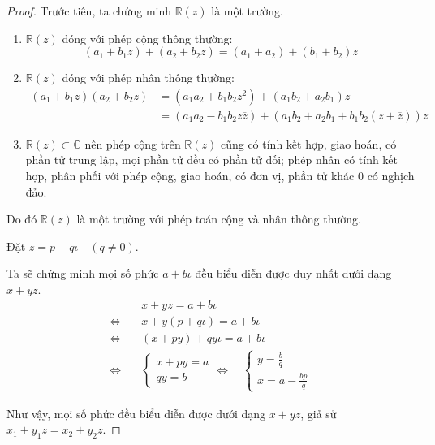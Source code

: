 \documentclass[class=linearalgebra,crop=false]{standalone}
\begin{document}
\begin{proof}Trước tiên, ta chứng minh $\mathbb{R}(z)$ là một trường.
    \begin{enumerate}[label = (\roman*)]
        \item $\mathbb{R}(z)$ đóng với phép cộng thông thường:
        \[ (a_{1} + b_{1}z) + (a_{2} + b_{2}z) = (a_{1} + a_{2}) + (b_{1} + b_{2})z \]
        \item $\mathbb{R}(z)$ đóng với phép nhân thông thường:
        \begin{align*}
            (a_{1} + b_{1}z)(a_{2} + b_{2}z) &= (a_{1}a_{2} + b_{1}b_{2}z^{2}) + (a_{1}b_{2} + a_{2}b_{1})z \\
                                             &= (a_{1}a_{2} - b_{1}b_{2}z\overline{z}) + (a_{1}b_{2} + a_{2}b_{1} + b_{1}b_{2}(z + \overline{z}))z
        \end{align*}
        \item $\mathbb{R}(z) \subset \mathbb{C}$ nên phép cộng trên $\mathbb{R}(z)$ cũng có tính kết hợp, giao hoán, có phần tử trung lập, mọi phần tử đều có phần tử đối; phép nhân có tính kết hợp, phân phối với phép cộng, giao hoán, có đơn vị, phần tử khác 0 có nghịch đảo.
    \end{enumerate}
    \par Do đó $\mathbb{R}(z)$ là một trường với phép toán cộng và nhân thông thường.
    \par Đặt $z = p + q\iota \quad (q\ne 0)$.
    \par Ta sẽ chứng minh mọi số phức $a + b\iota$ đều biểu diễn được duy nhất dưới dạng $x + yz$.
    \begin{align*}
        &x + yz = a + b\iota \\
        \Leftrightarrow\quad& x + y(p + q\iota) = a + b\iota \\
        \Leftrightarrow\quad& (x + py) + qy\iota = a + b\iota \\
        \Leftrightarrow\quad&
        \begin{cases}
            x + py = a \\
            qy = b
        \end{cases}
        \Leftrightarrow\quad
        \begin{cases}
            y = \frac{b}{q} \\
            x = a - \frac{bp}{q}
        \end{cases}
    \end{align*}
    \par Như vậy, mọi số phức đều biểu diễn được dưới dạng $x + yz$, giả sử $x_{1} + y_{1}z = x_{2} + y_{2}z$.

\end{proof}
\end{document}
